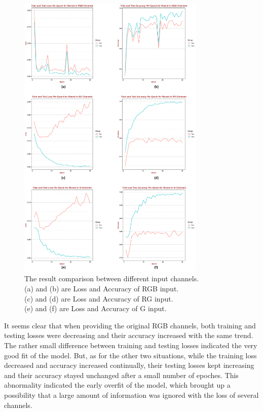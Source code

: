 \documentclass[12pt]{article}
\begin{document}
\begin{figure}[H]
\centering
\includegraphics[width=0.8\textwidth]{training_results.png}
\caption{The result comparison between different input channels. \protect\\
(a) and (b) are Loss and Accuracy of RGB input.\protect\\
(c) and (d) are Loss and Accuracy of RG input.\protect\\
(e) and (f) are Loss and Accuracy of G input.\protect\\}
\label{training_results}
\end{figure}
\par It seems clear that when providing the original RGB channels, both training and testing losses were decreasing and their accuracy increased with the same trend. The rather small difference between training and testing losses indicated the very good fit of the model. But, as for the other two situations, while the training loss decreased and accuracy increased continually, their testing losses kept increasing and their accuracy stayed unchanged after a small number of epoches. This abnormality indicated the early overfit of the model, which brought up a possibility that a large amount of information was ignored with the loss of several channels.
\end{document}
